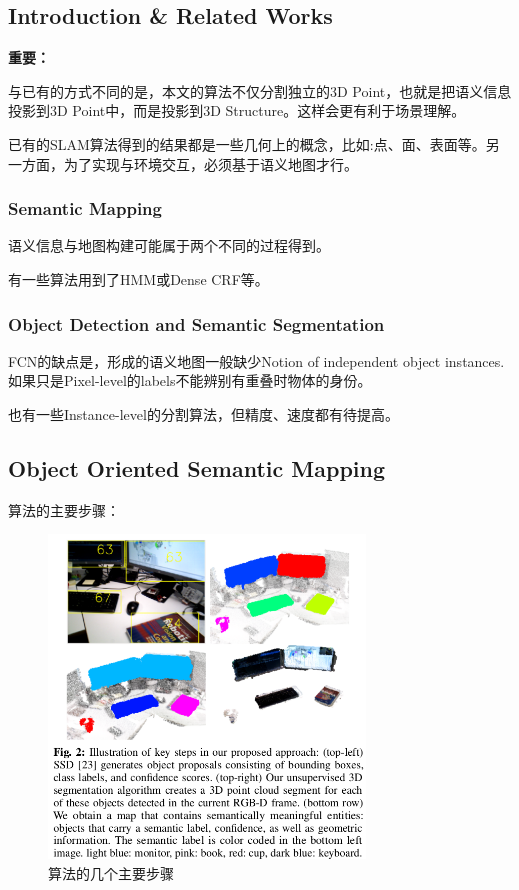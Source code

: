 \subsection{Introduction \& Related Works}

{\bfseries 重要：}

与已有的方式不同的是，本文的算法不仅分割独立的3D Point，也就是把语义信息投影到3D Point中，而是投影到3D Structure。这样会更有利于场景理解。

已有的SLAM算法得到的结果都是一些几何上的概念，比如:点、面、表面等。另一方面，为了实现与环境交互，必须基于语义地图才行。

\subsubsection{Semantic Mapping}

语义信息与地图构建可能属于两个不同的过程得到。

有一些算法用到了HMM或Dense CRF等。

\subsubsection{Object Detection and Semantic Segmentation}

FCN的缺点是，形成的语义地图一般缺少Notion of independent object instances. 如果只是Pixel-level的labels不能辨别有重叠时物体的身份。

也有一些Instance-level的分割算法，但精度、速度都有待提高。

\subsection{Object Oriented Semantic Mapping}

算法的主要步骤：
\begin{figure}[!hbtp]
\centering
\includegraphics[width=0.75\textwidth]{SemanticSLAM/OrientedMap0.png}
\caption{算法的几个主要步骤}
\label{OrientedMap0}
\end{figure}

